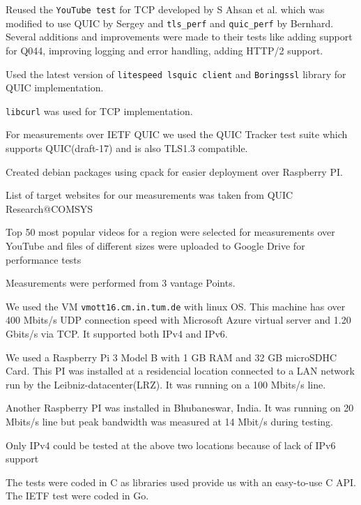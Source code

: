 \begin{frame}
Reused the \texttt{YouTube test} for TCP developed by S Ahsan et al.\cite{DBLP:conf/pam/AhsanBOS15} which was modified to use QUIC by Sergey\cite{sergey} and \texttt{tls\_perf} and \texttt{\texttt{quic\_perf}} by Bernhard\cite{bernhard}. Several additions and improvements were made to their tests like adding support for Q044, improving logging and error handling, adding HTTP/2 support.

Used the latest version of \texttt{litespeed lsquic client} and \texttt{Boringssl} library for QUIC implementation.

\texttt{libcurl} was used for TCP implementation.

For measurements over IETF QUIC we used the QUIC Tracker \cite{quic_tracker} test suite which supports QUIC(draft-17) and is also TLS1.3 compatible.

Created debian packages using cpack for easier deployment over Raspberry PI.

List of target websites for our measurements was taken from QUIC Research@COMSYS\cite{comsys}

Top 50 most popular videos for a region were selected for measurements over YouTube and files of different sizes were uploaded to Google Drive for performance tests

\end{frame}
\clearpage

\begin{frame}
    
Measurements were performed from 3 vantage Points.  

We used the VM \texttt{vmott16.cm.in.tum.de} with linux OS.
This machine has over 400 Mbits/s UDP connection speed with Microsoft Azure virtual
server and 1.20 Gbits/s via TCP. It supported both IPv4 and IPv6.


We used a Raspberry Pi 3 Model B with 1 GB RAM and 32 GB microSDHC Card. This PI was installed at a residencial location connected to a LAN network run by the Leibniz-datacenter(LRZ). It was running on a 100 Mbits/s line. 

Another Raspberry PI was installed in Bhubaneswar, India. It was running on 20 Mbits/s line but peak bandwidth was measured at 14 Mbit/s during testing. 

Only IPv4 could be tested at the above two locations because of lack of IPv6 support

The tests were coded in C as libraries used provide us with an easy-to-use C API.
The IETF test were coded in Go.

\end{frame}
\clearpage

